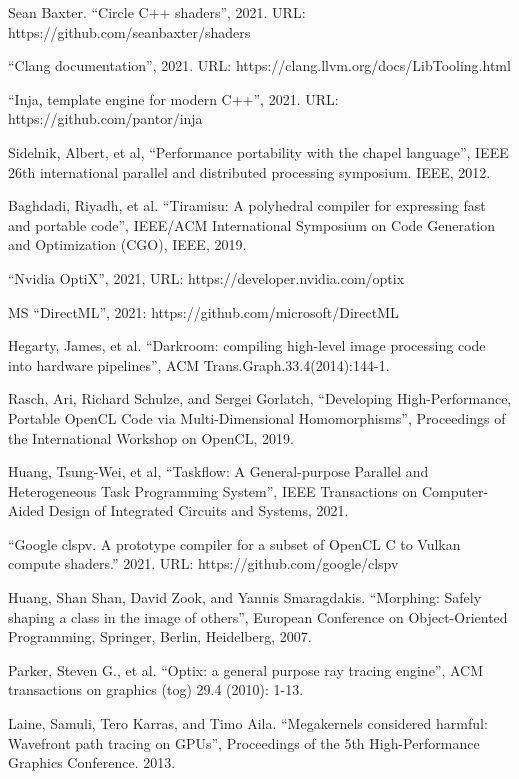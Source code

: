 \documentclass[11pt,fleqn,english,russian]{report} %
\begin{document}
\begin{thebibliography}{10}
	 Sean Baxter. ``Circle C++ shaders'', 2021. URL: https://github.com/seanbaxter/shaders  
	
	 ``Clang documentation'', 2021. URL: https://clang.llvm.org/docs/LibTooling.html
	
	 ``Inja, template engine for modern C++'', 2021. URL: https://github.com/pantor/inja
	
	 Sidelnik, Albert, et al, ``Performance portability with the chapel language'', IEEE 26th international parallel and distributed processing symposium. IEEE, 2012. 
	
	 Baghdadi, Riyadh, et al. ``Tiramisu: A polyhedral compiler for expressing fast and portable code'', IEEE/ACM International Symposium on Code Generation and Optimization (CGO), IEEE, 2019. 
	
	 ``Nvidia OptiX'', 2021, URL: https://developer.nvidia.com/optix 
	
	 MS ``DirectML'', 2021: https://github.com/microsoft/DirectML 
	
	 Hegarty, James, et al. ``Darkroom: compiling high-level image processing code into hardware pipelines'', ACM Trans.Graph.33.4(2014):144-1. 
	
	 Rasch, Ari, Richard Schulze, and Sergei Gorlatch, ``Developing High-Performance, Portable OpenCL Code via Multi-Dimensional Homomorphisms'', Proceedings of the International Workshop on OpenCL, 2019. 
	
	 Huang, Tsung-Wei, et al, ``Taskflow: A General-purpose Parallel and Heterogeneous Task Programming System'', IEEE Transactions on Computer-Aided Design of Integrated Circuits and Systems, 2021. 
	
	 ``Google clspv. A prototype compiler for a subset of OpenCL C to Vulkan compute shaders.'' 2021. URL: https://github.com/google/clspv
	
	 Huang, Shan Shan, David Zook, and Yannis Smaragdakis. ``Morphing: Safely shaping a class in the image of others'', European Conference on Object-Oriented Programming, Springer, Berlin, Heidelberg, 2007. 
	
	 Parker, Steven G., et al. ``Optix: a general purpose ray tracing engine'', ACM transactions on graphics (tog) 29.4 (2010): 1-13.
	
	 Laine, Samuli, Tero Karras, and Timo Aila. ``Megakernels considered harmful: Wavefront path tracing on GPUs'', Proceedings of the 5th High-Performance Graphics Conference. 2013.
	

\end{thebibliography}
\end{document}

